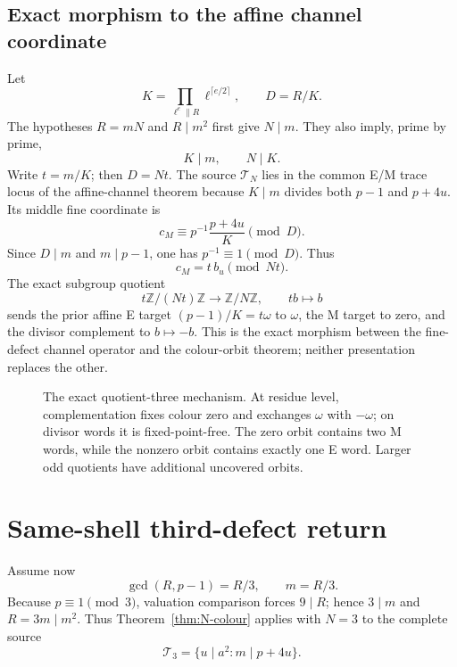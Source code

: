 \subsection{Exact morphism to the affine channel coordinate}

Let
\[
 K=\prod_{\ell^e\parallel R}\ell^{\lceil e/2\rceil},\qquad
 D=R/K.                                                         \tag{4.10}
\]
The hypotheses $R=mN$ and $R\mid m^2$ first give $N\mid m$.  They also imply,
prime by prime,
\[
 K\mid m,\qquad N\mid K.                                      \tag{4.11}
\]
Write $t=m/K$; then $D=Nt$.  The source $\mathcal T_N$ lies in the common E/M
trace locus of the affine-channel theorem because $K\mid m$ divides both
$p-1$ and $p+4u$.  Its middle fine coordinate is
\[
 c_M\equiv p^{-1}\frac{p+4u}{K}\pmod D.
\]
Since $D\mid m$ and $m\mid p-1$, one has $p^{-1}\equiv1\pmod D$.  Thus
\[
 c_M=t\,b_u\pmod{Nt}.                                          \tag{4.12}
\]
The exact subgroup quotient
\[
 t\mathbb Z/(Nt)\mathbb Z\longrightarrow\mathbb Z/N\mathbb Z,
 \qquad tb\longmapsto b                                       \tag{4.13}
\]
sends the prior affine E target
$(p-1)/K=t\omega$ to $\omega$, the M target to zero, and the divisor complement
to $b\mapsto-b$.  This is the exact morphism between the fine-defect channel
operator and the colour-orbit theorem; neither presentation replaces the other.

\begin{figure}[ht]
\centering

\caption{The exact quotient-three mechanism.  At residue level, complementation
fixes colour zero and exchanges $\omega$ with $-\omega$; on divisor words it is
fixed-point-free.  The zero orbit contains two M words, while the nonzero orbit
contains exactly one E word.  Larger odd quotients have additional uncovered
orbits.}
\label{fig:three-colour}
\end{figure}

\section{Same-shell third-defect return}

Assume now
\[
 \boxed{\gcd(R,p-1)=R/3},\qquad m=R/3.                           \tag{5.1}
\]
Because $p\equiv1\pmod3$, valuation comparison forces $9\mid R$; hence
$3\mid m$ and $R=3m\mid m^2$.  Thus Theorem~\ref{thm:N-colour} applies with
$N=3$ to the complete source
\[
 \mathcal T_3=\{u\mid a^2:m\mid p+4u\}.                         \tag{5.2}
\]


